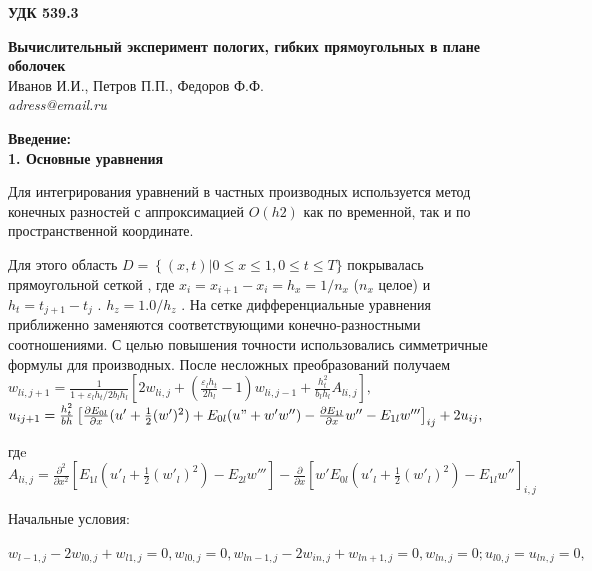 \documentclass[12pt,letterpaper]{extreport}
\begin{document}
\pagestyle{empty}

\begin{flushright}
{\bfseries \large УДК 539.3}
\end{flushright}

\begin{center}
\textbf{Вычислительный эксперимент пологих, гибких прямоугольных в плане
оболочек}\\
Иванов И.И., Петров П.П., Федоров Ф.Ф.\\
\textit{adress@email.ru}\\
\end{center}

\textbf{Введение:\\
1.	Основные уравнения}
\par Для интегрирования уравнений в частных производных используется метод
конечных разностей с аппроксимацией $O(h2)$ как по временной, так и по
пространственной координате. 
\par Для этого область $D=\left\{(x,t)|0\leq x \leq 1 , 0 \leq t \leq T\}
\right. $  покрывалась прямоугольной сеткой  , где $x_i =x_{i+1} -
x_i=h_x=1/n_x$  ($n_x$  целое) и $h_t=t_{j+1}-t_j$ . $h_z =1.0/h_z$ .
На сетке дифференциальные уравнения приближенно заменяются соответствующими
конечно-разностными соотношениями. С целью повышения точности использовались
симметричные формулы для производных. После несложных преобразований 
получаем\\
$w_{li, j+1}=\frac{1}{1+\varepsilon_l h_t /2b_l h_l} \left[2w_{li,j}+
(\frac{\varepsilon_l h_t}{2h_l}-1)w_{li,j-1}+\frac{h_t^2}{b_l h_l}A_{li,j}
\right],$
\\$u_{ij+1}=\frac{h_t^2}{bh}
\left[\frac{\partial E_{0l}}{\partial
x}(u'+\frac{1}{2}(w')^2)+E_{0l}(u"+w'w'')-\frac{\partial E_{1l}}{\partial x}w''
- E_{1l}w'''

\right]_{ij} +2u_{ij},$\\
\par гдe\\
$A_{li,j}=\frac{\partial^2}{\partial x^2}\left[E_{1l}(u'_l +
\frac{1}{2}(w'_l)^2)-E_{2l}w'''\right] -\frac{\partial}{\partial
x}\left[w'E_{0l}(u'_l
+\frac{1}{2}(w'_l)^2)-E_{1l}w''\right]_{i,j}$\\

\par Начальные условия:

$w_{l-1,j} - 2w_{l0,j} + w_{l1,j} = 0, w_{l0,j} = 0, w_{ln-1,j} - 2w_{in,j} + 
w_{ln+1,j} = 0,
w_{ln,j} =0; u_{l0, j}= u_{ln,j} = 0, $
\end{document}
